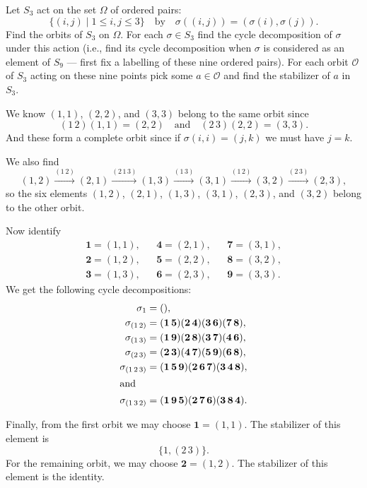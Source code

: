  Let $S_3$ act on the set $\Omega$ of ordered pairs:
\begin{equation*}
  \{(i,j)\mid1\leq i,j\leq3\} \quad\text{by}\quad
  \sigma((i,j)) = (\sigma(i), \sigma(j)).
\end{equation*}
Find the orbits of $S_3$ on $\Omega$. For each $\sigma\in S_3$ find
the cycle decomposition of $\sigma$ under this action (i.e., find its
cycle decomposition when $\sigma$ is considered as an element of $S_9$
--- first fix a labelling of these nine ordered pairs). For each orbit
$\mathcal{O}$ of $S_3$ acting on these nine points pick some
$a\in\mathcal{O}$ and find the stabilizer of $a$ in $S_3$.
\begin{solution}
  We know $(1,1)$, $(2,2)$, and $(3,3)$ belong to the same orbit since
  \begin{equation*}
    (1\,2)(1,1) = (2,2) \quad\text{and}\quad
    (2\,3)(2,2) = (3,3).
  \end{equation*}
  And these form a complete orbit since if $\sigma(i,i) = (j,k)$ we
  must have $j = k$.

  We also find
  \begin{equation*}
    (1,2)
    \xrightarrow{(1\,2)} (2,1)
    \xrightarrow{(2\,1\,3)} (1,3)
    \xrightarrow{(1\,3)} (3,1)
    \xrightarrow{(1\,2)} (3,2)
    \xrightarrow{(2\,3)} (2,3),
  \end{equation*}
  so the six elements $(1,2)$, $(2,1)$, $(1,3)$, $(3,1)$, $(2,3)$, and
  $(3,2)$ belong to the other orbit.

  Now identify
  \begin{align*}
    \mathbf1 = (1,1), && \mathbf4 = (2,1), && \mathbf7 = (3,1), \\
    \mathbf2 = (1,2), && \mathbf5 = (2,2), && \mathbf8 = (3,2), \\
    \mathbf3 = (1,3), && \mathbf6 = (2,3), && \mathbf9 = (3,3).
  \end{align*}
  We get the following cycle decompositions:
  \begin{align*}
    \sigma_1
    &= (), \\
    \sigma_{(1\,2)}
    &= (\mathbf1\,\mathbf5)(\mathbf2\,\mathbf4)
      (\mathbf3\,\mathbf6)(\mathbf7\,\mathbf8), \\
    \sigma_{(1\,3)}
    &= (\mathbf1\,\mathbf9)(\mathbf2\,\mathbf8)
      (\mathbf3\,\mathbf7)(\mathbf4\,\mathbf6), \\
    \sigma_{(2\,3)}
    &= (\mathbf2\,\mathbf3)(\mathbf4\,\mathbf7)
      (\mathbf5\,\mathbf9)(\mathbf6\,\mathbf8), \\
    \sigma_{(1\,2\,3)}
    &= (\mathbf1\,\mathbf5\,\mathbf9)(\mathbf2\,\mathbf6\,\mathbf7)
      (\mathbf3\,\mathbf4\,\mathbf8), \\
    \intertext{and}
    \sigma_{(1\,3\,2)}
    &= (\mathbf1\,\mathbf9\,\mathbf5)(\mathbf2\,\mathbf7\,\mathbf6)
      (\mathbf3\,\mathbf8\,\mathbf4).
  \end{align*}

  Finally, from the first orbit we may choose $\mathbf1 = (1,1)$. The
  stabilizer of this element is
  \begin{equation*}
    \{1, (2\,3)\}.
  \end{equation*}
  For the remaining orbit, we may choose $\mathbf2 = (1,2)$. The
  stabilizer of this element is the identity.
\end{solution}
